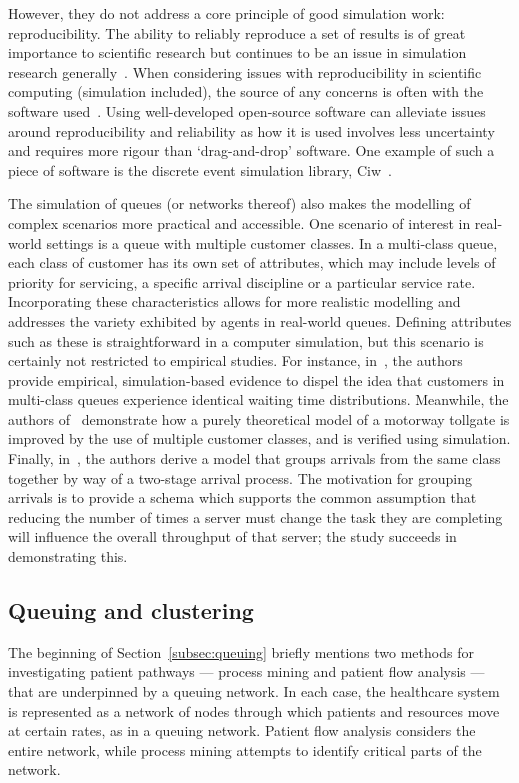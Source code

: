 However, they do not address a core principle of good simulation work:
reproducibility. The ability to reliably reproduce a set of results is of great
importance to scientific research but continues to be an issue in simulation
research generally~\cite{Fitzpatrick2019,Taylor2018}. When considering issues
with reproducibility in scientific computing (simulation included), the source
of any concerns is often with the software used~\cite{Ivie2018}. Using
well-developed open-source software can alleviate issues around reproducibility
and reliability as how it is used involves less uncertainty and requires more
rigour than `drag-and-drop' software. One example of such a piece of software is
the discrete event simulation library, Ciw~\cite{Palmer2019}.

The simulation of queues (or networks thereof) also makes the modelling of
complex scenarios more practical and accessible. One scenario of interest in
real-world settings is a queue with multiple customer classes. In a multi-class
queue, each class of customer has its own set of attributes, which may include
levels of priority for servicing, a specific arrival discipline or a particular
service rate. Incorporating these characteristics allows for more realistic
modelling and addresses the variety exhibited by agents in real-world queues.
Defining attributes such as these is straightforward in a computer simulation,
but this scenario is certainly not restricted to empirical studies. For
instance, in~\cite{RomeroSilva2017}, the authors provide empirical,
simulation-based evidence to dispel the idea that customers in multi-class
queues experience identical waiting time distributions. Meanwhile, the authors
of~\cite{Pompigna2020} demonstrate how a purely theoretical model of a motorway
tollgate is improved by the use of multiple customer classes, and is verified
using simulation. Finally, in~\cite{Reveil2014}, the authors derive a model that
groups arrivals from the same class together by way of a two-stage arrival
process. The motivation for grouping arrivals is to provide a schema which
supports the common assumption that reducing the number of times a server must
change the task they are completing will influence the overall throughput of
that server; the study succeeds in demonstrating this.

\subsection{Queuing and clustering}

The beginning of Section~\ref{subsec:queuing} briefly mentions two methods
for investigating patient pathways --- process mining and patient flow analysis
--- that are underpinned by a queuing network. In each case, the healthcare
system is represented as a network of nodes through which patients and resources
move at certain rates, as in a queuing network. Patient flow analysis considers
the entire network, while process mining attempts to identify critical parts of
the network.


